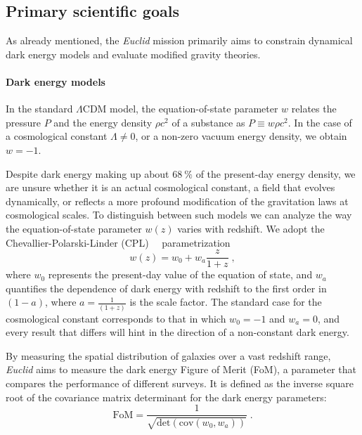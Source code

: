 \documentclass[12pt,a4paper,oneside]{report}
\begin{document}
\subsection{Primary scientific goals}\label{subsec:PrimaryScientificGoals}
As already mentioned, the \textit{Euclid} mission primarily aims to constrain dynamical dark energy models and evaluate modified gravity theories.

\paragraph{Dark energy models}\label{parag:DarkEnergyModel}
In the standard $\Lambda\mathrm{CDM}$ model, the equation-of-state parameter $w$ relates the pressure $P$ and the energy density $\rho c^2$ of a substance as $P \equiv w \rho c^2$. In the case of a cosmological constant $\Lambda \neq 0$, or a non-zero vacuum energy density, we obtain $w = -1$.

Despite dark energy making up about $\SI{68}{\percent}$ of the present-day energy density, we are unsure whether it is an actual cosmological constant, a field that evolves dynamically, or reflects a more profound modification of the gravitation laws at cosmological scales. To distinguish between such models we can analyze the way the equation-of-state parameter $w(z)$ varies with redshift. We adopt the Chevallier-Polarski-Linder (CPL)~\cite{CP_param}~\cite{L_param} parametrization
\begin{equation}
  w(z) = w_0 + w_a \frac{z}{1 + z} \; ,
  \label{eq:wParameter}
\end{equation}
where $w_0$ represents the present-day value of the equation of state, and $w_a$ quantifies the dependence of dark energy with redshift to the first order in $(1-a)$, where $a = \frac{1}{(1 + z)}$ is the scale factor. The standard case for the cosmological constant corresponds to that in which $w_0 = - 1 $ and $w_a = 0$, and every result that differs will hint in the direction of a non-constant dark energy.

By measuring the spatial distribution of galaxies over a vast redshift range, \textit{Euclid} aims to measure the dark energy Figure of Merit (FoM), a parameter that compares the performance of different surveys. It is defined as the inverse square root of the covariance matrix determinant for the dark energy parameters:
\begin{equation}
  \mathrm{FoM} = \frac{1}{\sqrt{\mathrm{det}(\mathrm{cov}(w_0,w_a))}} \; .
  \label{eq:DE_FoM}
\end{equation}
\end{document}
